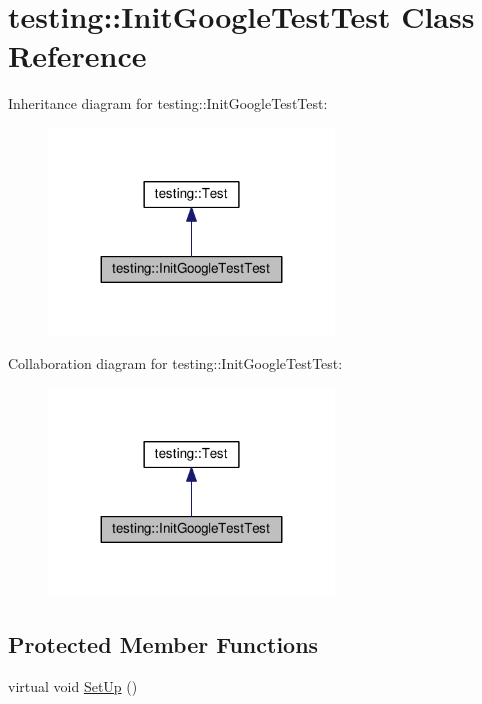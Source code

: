 \hypertarget{classtesting_1_1InitGoogleTestTest}{}\section{testing\+:\+:Init\+Google\+Test\+Test Class Reference}
\label{classtesting_1_1InitGoogleTestTest}


Inheritance diagram for testing\+:\+:Init\+Google\+Test\+Test\+:\nopagebreak
\begin{figure}[H]
\begin{center}
\leavevmode
\includegraphics[width=215pt]{classtesting_1_1InitGoogleTestTest__inherit__graph}
\end{center}
\end{figure}


Collaboration diagram for testing\+:\+:Init\+Google\+Test\+Test\+:\nopagebreak
\begin{figure}[H]
\begin{center}
\leavevmode
\includegraphics[width=215pt]{classtesting_1_1InitGoogleTestTest__coll__graph}
\end{center}
\end{figure}
\subsection*{Protected Member Functions}
\begin{DoxyCompactItemize}
\item 
virtual void \hyperlink{classtesting_1_1InitGoogleTestTest_a49de9e552ea788c4b79924ec4135ca7a}{Set\+Up} ()
\end{DoxyCompactItemize}
